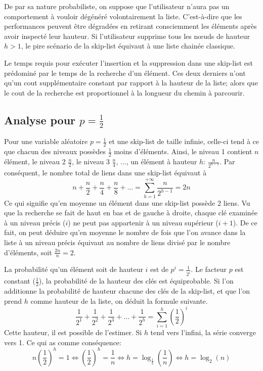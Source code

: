 \documentclass[hidelinks,a4paper, 12pt]{article}
\begin{document}
	De par sa nature probabiliste, on suppose que l'utilisateur n'aura pas un comportement à vouloir dégénéré volontairement la liste. C'est-à-dire que les performances peuvent être dégradées en retirant consciemment les éléments après avoir inspecté leur hauteur. Si l'utilisateur supprime tous les nœuds de hauteur $h>1$, le pire scénario de la skip-list équivaut à une liste chainée classique.
	
	Le temps requis pour exécuter l'insertion et la suppression dans une skip-list est prédominé par le temps de la recherche d'un élément. Ces deux derniers n'ont qu'un cout supplémentaire constant par rapport à la hauteur de la liste; alors que le cout de la recherche est proportionnel à la longueur du chemin à parcourir.
	
	
	\subsection{Analyse pour $p=\frac{1}{2}$}
	Pour une variable aléatoire $p=\frac{1}{2}$ et une skip-list de taille infinie, celle-ci tend à ce que chacun des niveaux possèdes $\frac{1}{2}$ moins d'éléments. Ainsi, le niveau 1 contient $n$ élément, le niveau 2 $\frac{n}{2}$, le niveau 3 $\frac{n}{4}$, ..., un élément à hauteur $h$: $\frac{n}{{2}^{h-1}}$. Par conséquent, le nombre total de liens dans une skip-list équivaut à \[n+\frac{n}{2}+\frac{n}{4}+\frac{n}{8}+\dots = \sum_{h=1}^{+\infty}\frac{n}{{2}^{h-1}}=2n\] Ce qui signifie qu'en moyenne un élément dans une skip-list possède 2 liens. Vu que la recherche se fait de haut en bas et de gauche à droite, chaque clé examinée à un niveau précis ($i$) ne peut pas appartenir à un niveau supérieur ($i+1$).
	De ce fait, on peut déduire qu'en moyenne le nombre de fois que l'on avance dans la liste à un niveau précis équivaut au nombre de liens divisé par le nombre d'éléments, soit $\frac{2n}{n}=2$.
	
	\newpage
	La probabilité qu'un élément soit de hauteur $i$ est de ${p^{i}} = \frac{1}{2^{i}} $. Le facteur $p$ est constant ($\frac{1}{2}$), la probabilité de la hauteur des clés est équiprobable. Si l'on additionne la probabilité de hauteur chacune des clés de la skip-list, et que l'on prend $h$ comme hauteur de la liste, on déduit la formule suivante.
	\[
		\frac{1}{{2}^{1}}+\frac{1}{{2}^{2}}+\frac{1}{{2}^{3}}+\dots+\frac{1}{{2}^{h}}
		= \sum _{i=1}^{h} ({\frac{1}{2}})^{i}
	\]
	Cette hauteur, il est possible de l'estimer. Si $h$ tend vers l'infini, la série converge vers 1. Ce qui as comme conséquence:
	\[
		n{(\frac{1}{2})}^{h} = 1
		\iff {(\frac{1}{2})}^{h}=\frac{1}{n}
		\iff h = \log_{\frac{1}{2}}(\frac{1}{n})
		\iff h = \log_{2}(n)
	\]
	
\end{document}
